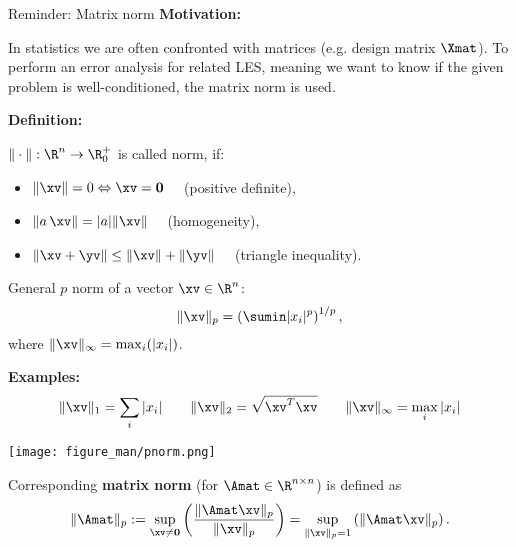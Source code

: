 \documentclass[11pt,compress,t,notes=noshow, xcolor=table]{beamer}
\begin{document}
\begin{vbframe}{Reminder: Matrix norm}
\vspace*{-0.1cm}
\textbf{Motivation:}

In statistics we are often confronted with matrices (e.g. design matrix $\Xmat$). To perform an error analysis for related LES, meaning we want to know if the given problem is well-conditioned, the matrix norm is used.

\lz
\vspace*{-0.1cm}
\textbf{Definition:}

$\|\cdot\| : \R^n \rightarrow \R^+_0$ is called norm, if:
\begin{itemize}
\item $\|\xv\| = 0 \Leftrightarrow \xv = \mathbf{0} \quad$ (positive definite),
\item $\|a \, \xv\| = |a|\|\xv\| \quad$ (homogeneity),
\item $\|\xv + \yv\| \leq \|\xv\| + \|\yv\| \quad$ (triangle inequality).
\end{itemize}
\medskip 

General $p$ norm of a vector $\xv \in \R^n$:
$$
\|\xv\|_p = \left(\sumin |x_i|^p\right)^{1/p},
$$
where $\|\xv\|_\infty = \max_i (|x_i|)$.\\
\medskip

\framebreak

\textbf{Examples:}
$$
\|\xv\|_1 = \sum_i |x_i| \qquad  \|\xv\|_2 = \sqrt{\xv^T\xv}
\qquad  \|\xv\|_\infty = \max_i |x_i|
$$

\vspace*{-.6cm}

\begin{center}
\texttt{[image: figure\_man/pnorm.png]}
\end{center}

\framebreak 

Corresponding \textbf{matrix norm} (for $\Amat \in \R^{n \times n}$) is defined as
$$
\|\Amat\|_p := \sup_{\xv \not = \mathbf{0}}\left(\frac{\|\Amat \xv\|_p}{\|\xv\|_p}\right) =
  \sup_{\|\xv\|_p = 1} \left( \|\Amat\xv\|_p \right).
$$




\end{vbframe}
\end{document}
